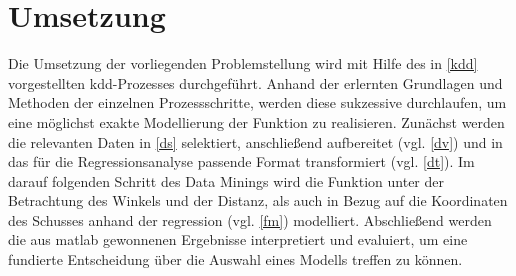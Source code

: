 \chapter{Umsetzung}
\label{umsetzung}

Die Umsetzung der vorliegenden Problemstellung wird mit Hilfe des in \vref{kdd} vorgestellten \gls{kdd}-Prozesses durchgeführt. Anhand der erlernten Grundlagen und Methoden der einzelnen Prozessschritte, werden diese sukzessive durchlaufen, um eine möglichst exakte Modellierung der Funktion zu realisieren. Zunächst werden die relevanten Daten in \vref{ds} selektiert, anschließend aufbereitet (vgl. \vref{dv}) und in das für die Regressionsanalyse passende Format transformiert (vgl. \vref{dt}). Im darauf folgenden Schritt des Data Minings wird die Funktion unter der Betrachtung des Winkels und der Distanz, als auch in Bezug auf die Koordinaten des Schusses anhand der \gls{regression} (vgl. \vref{fm}) modelliert. Abschließend werden die aus \gls{matlab} gewonnenen Ergebnisse interpretiert und evaluiert, um eine fundierte Entscheidung über die Auswahl eines Modells treffen zu können.





